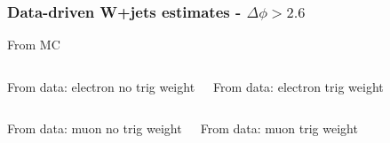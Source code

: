 \documentclass[red,compress,xcolor=table]{beamer}
\begin{document}
\begin{frame}
  \frametitle{Data-driven W+jets estimates - $\Delta\phi>2.6$}

\vspace*{-0.5cm}
\begin{block}{\scriptsize From MC}
\begin{center}
    {\tiny
      
    }
\end{center}
  \end{block}

\vspace*{-0.2cm}
\begin{columns}
  \begin{block}{\scriptsize From data: electron no trig weight}
    {\tiny
      
    }
  \end{block}
  \begin{block}{\scriptsize From data: electron trig weight }
    {\tiny
      
    }
  \end{block}
\end{columns}
\begin{columns}
  \begin{block}{\scriptsize From data: muon no trig weight }
    {\tiny
      
    }
  \end{block}
  \begin{block}{\scriptsize From data: muon trig weight}
    {\tiny
      
    }
  \end{block}
\end{columns}


\end{frame}
\end{document}
